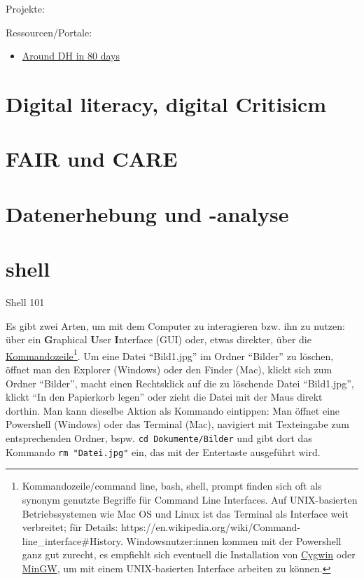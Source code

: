 \documentclass[
  letterpaper,
]{book}
\providecommand{\tightlist}{%
  \setlength{\itemsep}{0pt}\setlength{\parskip}{0pt}}\usepackage{longtable,booktabs,array}
\begin{document}
Projekte:

Ressourcen/Portale:

\begin{itemize}
\tightlist
\item
  \href{https://arounddh.org/index.html}{Around DH in 80 days}
\end{itemize}


\hypertarget{digital-literacy-digital-critisicm}{%
\chapter{Digital literacy, digital
Critisicm}\label{digital-literacy-digital-critisicm}}


\hypertarget{fair-und-care}{%
\chapter{FAIR und CARE}\label{fair-und-care}}


\hypertarget{datenerhebung-und--analyse}{%
\chapter{Datenerhebung und -analyse}\label{datenerhebung-und--analyse}}


\hypertarget{shell}{%
\chapter{shell}\label{shell}}

Shell 101

Es gibt zwei Arten, um mit dem Computer zu interagieren bzw. ihn zu
nutzen: über ein \textbf{G}raphical \textbf{U}ser \textbf{I}nterface
(GUI) oder, etwas direkter, über die
\href{https://de.wikipedia.org/wiki/Kommandozeile}{Kommandozeile}\footnote{Kommandozeile/command
  line, bash, shell, prompt finden sich oft als synonym genutzte
  Begriffe für Command Line Interfaces. Auf UNIX-basierten
  Betriebssystemen wie Mac OS und Linux ist das Terminal als Interface
  weit verbreitet; für Details:
  https://en.wikipedia.org/wiki/Command-line\_interface\#History.
  Windowsnutzer:innen kommen mit der Powershell ganz gut zurecht, es
  empfiehlt sich eventuell die Installation von
  \href{https://en.wikipedia.org/wiki/Cygwin}{Cygwin} oder
  \href{https://en.wikipedia.org/wiki/MinGW}{MinGW}, um mit einem
  UNIX-basierten Interface arbeiten zu können.}. Um eine Datei
``Bild1.jpg'' im Ordner ``Bilder'' zu löschen, öffnet man den Explorer
(Windows) oder den Finder (Mac), klickt sich zum Ordner ``Bilder'',
macht einen Rechtsklick auf die zu löschende Datei ``Bild1.jpg'', klickt
``In den Papierkorb legen'' oder zieht die Datei mit der Maus direkt
dorthin. Man kann dieselbe Aktion als Kommando eintippen: Man öffnet
eine Powershell (Windows) oder das Terminal (Mac), navigiert mit
Texteingabe zum entsprechenden Ordner, bspw.
\texttt{cd\ Dokumente/Bilder} und gibt dort das Kommando
\texttt{rm\ "Datei.jpg"} ein, das mit der Entertaste ausgeführt wird.
\end{document}
